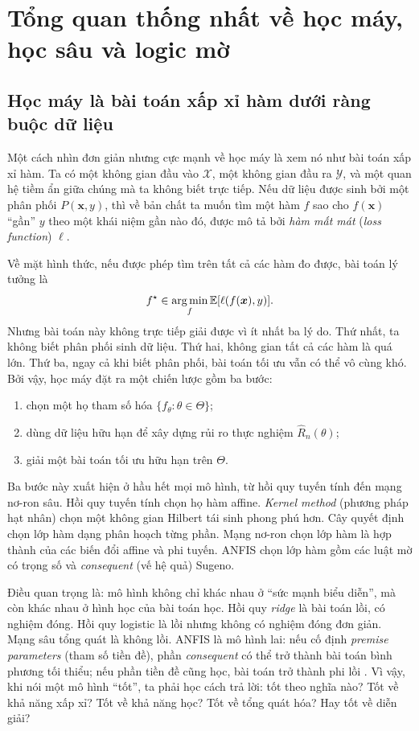 \chapter{Tổng quan thống nhất về học máy, học sâu và logic mờ}

\section{Học máy là bài toán xấp xỉ hàm dưới ràng buộc dữ liệu}

Một cách nhìn đơn giản nhưng cực mạnh về học máy là xem nó như bài toán xấp xỉ hàm. Ta có một không gian đầu vào $\mathcal{X}$, một không gian đầu ra $\mathcal{Y}$, và một quan hệ tiềm ẩn giữa chúng mà ta không biết trực tiếp. Nếu dữ liệu được sinh bởi một phân phối $P(\bm{x},y)$, thì về bản chất ta muốn tìm một hàm $f$ sao cho $f(\bm{x})$ ``gần'' $y$ theo một khái niệm gần nào đó, được mô tả bởi \emph{hàm mất mát} (\emph{loss function}) $\ell$.

Về mặt hình thức, nếu được phép tìm trên tất cả các hàm đo được, bài toán lý tưởng là
\[
f^\star \in \mathop{\mathrm{arg\,min}}_{f} \mathbb{E}[\ell(f(\bm{x}),y)].
\]
Nhưng bài toán này không trực tiếp giải được vì ít nhất ba lý do. Thứ nhất, ta không biết phân phối sinh dữ liệu. Thứ hai, không gian tất cả các hàm là quá lớn. Thứ ba, ngay cả khi biết phân phối, bài toán tối ưu vẫn có thể vô cùng khó. Bởi vậy, học máy đặt ra một chiến lược gồm ba bước:

\begin{enumerate}
\item chọn một họ tham số hóa $\{f_\theta : \theta \in \Theta\}$;
\item dùng dữ liệu hữu hạn để xây dựng rủi ro thực nghiệm $\widehat{R}_n(\theta)$;
\item giải một bài toán tối ưu hữu hạn trên $\Theta$.
\end{enumerate}

Ba bước này xuất hiện ở hầu hết mọi mô hình, từ hồi quy tuyến tính đến mạng nơ-ron sâu. Hồi quy tuyến tính chọn họ hàm affine. \emph{Kernel method} (phương pháp hạt nhân) chọn một không gian Hilbert tái sinh phong phú hơn. Cây quyết định chọn lớp hàm dạng phân hoạch từng phần. Mạng nơ-ron chọn lớp hàm là hợp thành của các biến đổi affine và phi tuyến. ANFIS chọn lớp hàm gồm các luật mờ có trọng số và \emph{consequent} (vế hệ quả) Sugeno.

Điều quan trọng là: mô hình không chỉ khác nhau ở ``sức mạnh biểu diễn'', mà còn khác nhau ở hình học của bài toán học. Hồi quy \emph{ridge} là bài toán lồi, có nghiệm đóng. Hồi quy logistic là lồi nhưng không có nghiệm đóng đơn giản. Mạng sâu tổng quát là không lồi. ANFIS là mô hình lai: nếu cố định \emph{premise parameters} (tham số tiền đề), phần \emph{consequent} có thể trở thành bài toán bình phương tối thiểu; nếu phần tiền đề cũng học, bài toán trở thành phi lồi \citep{jang1993anfis}. Vì vậy, khi nói một mô hình ``tốt'', ta phải học cách trả lời: tốt theo nghĩa nào? Tốt về khả năng xấp xỉ? Tốt về khả năng học? Tốt về tổng quát hóa? Hay tốt về diễn giải?

